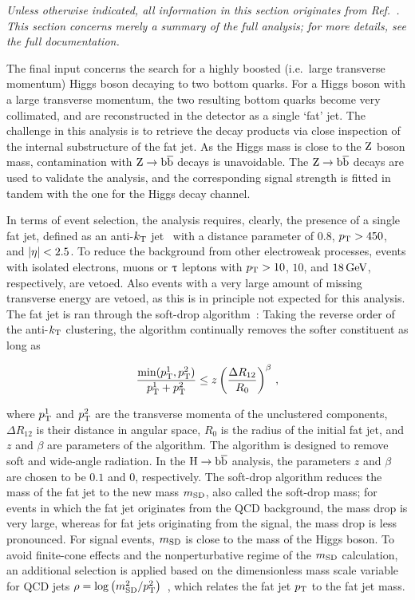 \emph{%
Unless otherwise indicated, all information in this section originates from Ref.~\cite{Sirunyan:2017dgc}. This section concerns merely a summary of the full analysis; for more details, see the full documentation.
}

The final input concerns the search for a highly boosted (i.e.\ large transverse momentum) Higgs boson decaying to two bottom quarks.
% 
For a Higgs boson with a large transverse momentum, the two resulting bottom quarks become very collimated, and are reconstructed in the detector as a single `fat' jet.
% 
The challenge in this analysis is to retrieve the decay products via close inspection of the internal substructure of the fat jet.
% 
As the Higgs mass is close to the $\mathrm{Z}$ boson mass, contamination with $\mathrm{Z}\to\mathrm{b}\overline{\mathrm{b}}$ decays is unavoidable.
% 
The $\mathrm{Z}\to\mathrm{b}\overline{\mathrm{b}}$ decays are used to validate the analysis, and the corresponding signal strength is fitted in tandem with the one for the Higgs decay channel.


In terms of event selection, the analysis requires, clearly, the presence of a single fat jet, defined as an anti-$k_\mathrm{T}$ jet~\cite{Cacciari:2008gp} with a distance parameter of $0.8$, $p_\mathrm{T} > 450$\GeV, and $\left| \eta \right |<2.5$.
% 
To reduce the background from other electroweak processes, events with isolated electrons, muons or $\uptau$ leptons with $p_\mathrm{T} > 10$, $10$, and $18\,\text{GeV}$, respectively, are vetoed.
% 
Also events with a very large amount of missing transverse energy are vetoed, as this is in principle not expected for this analysis.
% 
The fat jet is ran through the soft-drop algorithm~\cite{Dasgupta:2013ihk,Larkoski:2014wba}: Taking the reverse order of the anti-$k_\mathrm{T}$ clustering, the algorithm continually removes the softer constituent as long as
% 
\begin{linenomath*}
\begin{equation}
\frac{ \text{min}( p_\mathrm{T}^1, p_\mathrm{T}^2 ) }{ p_\mathrm{T}^1 + p_\mathrm{T}^2 }
    \leq
    z \left( \frac{\Delta R_{12}}{R_0} \right)^\beta
\,,
\end{equation}
\end{linenomath*}
% 
where $p_\mathrm{T}^1$ and $p_\mathrm{T}^2$ are the transverse momenta of the unclustered components, $\Delta R_{12}$ is their distance in angular space, $R_0$ is the radius of the initial fat jet, and $z$ and $\beta$ are parameters of the algorithm.
% 
The algorithm is designed to remove soft and wide-angle radiation.
% 
In the $\mathrm{H}\to\mathrm{b}\overline{\mathrm{b}}$ analysis, the parameters $z$ and $\beta$ are chosen to be $0.1$ and $0$, respectively.
% 
The soft-drop algorithm reduces the mass of the fat jet to the new mass $m_\mathrm{SD}$, also called the soft-drop mass; for events in which the fat jet originates from the QCD background, the mass drop is very large, whereas for fat jets originating from the signal, the mass drop is less pronounced.
% 
For signal events, $m_\mathrm{SD}$ is close to the mass of the Higgs boson.
% 
To avoid finite-cone effects and the nonperturbative regime of the $m_\mathrm{SD}$ calculation, an additional selection is applied based on the dimensionless mass scale variable for QCD jets $\rho=\log\left(m_\mathrm{SD}^2/p_\mathrm{T}^2\right)$~\cite{Dasgupta:2013ihk}, which relates the fat jet $p_\mathrm{T}$ to the fat jet mass.


